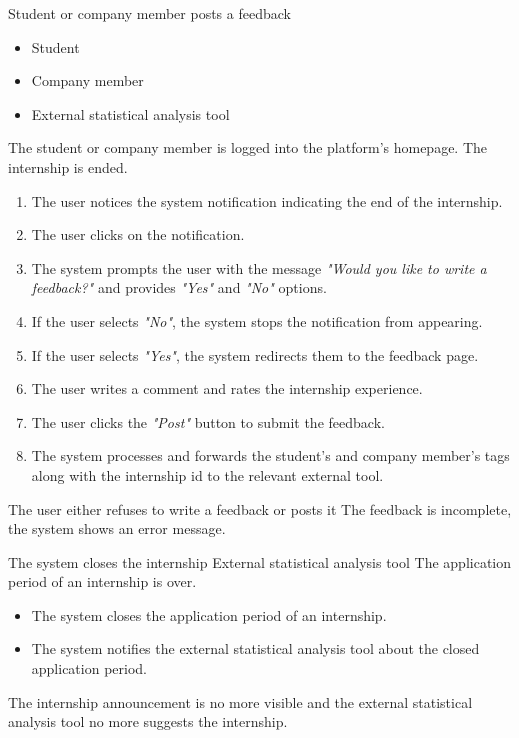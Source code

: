 \usecase
{Student or company member posts a feedback}
{
    \begin{itemize}
    \item Student
    \item Company member
    \item External statistical analysis tool
    \end{itemize}
}
{
    The student or company member is logged into the platform's homepage. 
    The internship is ended.
}
{
    \begin{enumerate}
        \item The user notices the system notification indicating the end of the internship.
        \item The user clicks on the notification.
        \item The system prompts the user with the message \textit{"Would you like to write a feedback?"} and provides \textit{"Yes"} and \textit{"No"} options.
        \item If the user selects \textit{"No"}, the system stops the notification from appearing.
        \item If the user selects \textit{"Yes"}, the system redirects them to the feedback page.
        \item The user writes a comment and rates the internship experience.
        \item The user clicks the \textit{"Post"} button to submit the feedback.
        \item The system processes and forwards the student's and company member's tags along with the internship id to the relevant external tool.
    \end{enumerate}
}
{The user either refuses to write a feedback or posts it}
{The feedback is incomplete, the system shows an error message.}
{}

\usecase
{The system closes the internship}
{
    External statistical analysis tool
}
{
    The application period of an internship is over.
}
{
    \begin{itemize}
        \item The system closes the application period of an internship.
        \item The system notifies the external statistical analysis tool about the closed application period.
    \end{itemize}
}
{
    The internship announcement is no more visible and the external statistical analysis tool no more suggests the internship.
}
{}
{}


